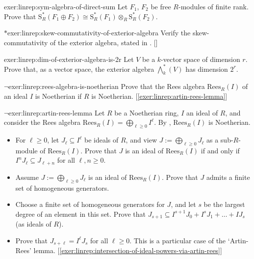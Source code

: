 \begin{exer}{}{exer:linrep:sym-algebra-of-direct-sum}
  Let $F_1$, $F_2$ be free $R$-modules of finite rank. Prove that
  $\mathrm{S}^*_R(F_1 \oplus F_2) \cong \mathrm{S}^*_R(F_1) \otimes_R
  \mathrm{S}^*_R(F_2)$.
\end{exer}

\begin{exer}{$*$}{exer:linrep:skew-commutativity-of-exterior-algebra}
  Verify the skew-commutativity of the exterior algebra, stated in
  . []
\end{exer}

\begin{exer}{}{exer:linrep:dim-of-exterior-algebra-is-2r}
  Let $V$ be a $k$-vector space of dimension $r$. Prove that, as a
  vector space, the exterior algebra $\bigwedge^*_k(V)$ has dimension
  $2^r$.
\end{exer}
\begin{exer}{$\lnot$}{exer:linrep:rees-algebra-is-noetherian}
  Prove that the Rees algebra $\mathrm{Rees}_R(I)$ of an ideal $I$ is
  Noetherian if $R$ is
  Noetherian. [\ref{exer:linrep:artin-rees-lemma}]
\end{exer}

\begin{exer}{$\lnot$}{exer:linrep:artin-rees-lemma}
  Let $R$ be a Noetherian ring, $I$ an ideal of $R$, and consider the
  Rees algebra $\mathrm{Rees}_R(I) = \bigoplus_{\ell \geq 0} I^\ell$.
  By ,
  $\mathrm{Rees}_R(I)$ is Noetherian.
  \begin{itemize}
  \item For $\ell \geq 0$, let $J_\ell \subseteq I^\ell$ be ideals of
    $R$, and view $J := \bigoplus_{\ell \geq 0} J_\ell$ as a
    sub-$R$-module of $\mathrm{Rees}_R(I)$. Prove that $J$ is an ideal
    of $\mathrm{Rees}_R(I)$ if and only if
    $I^n J_\ell \subseteq J_{\ell+n}$ for all $\ell, n \geq 0$.
  \item Assume $J := \bigoplus_{\ell \geq 0} J_\ell$ is an ideal of
    $\mathrm{Rees}_R(I)$. Prove that $J$ admits a finite set of
    homogeneous generators.
  \item Choose a finite set of homogeneous generators for $J$, and let
    $s$ be the largest degree of an element in this set. Prove that
    $J_{s+1} \subseteq I^{s+1} J_0 + I^s J_1 + \dots + I J_s$ (as
    ideals of $R$).
  \item Prove that $J_{s+\ell} = I^\ell J_s$ for all $\ell \geq 0$.
    This is a particular case of the `Artin-Rees'
    lemma. [\ref{exer:linrep:intersection-of-ideal-powers-via-artin-rees}]
  \end{itemize}
\end{exer}


